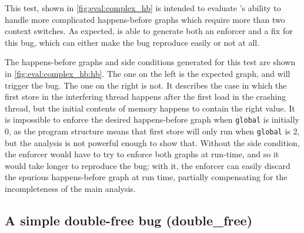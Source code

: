 This test, shown in \autoref{fig:eval:complex_hb} is intended to
evaluate {\technique}'s ability to handle more complicated
happens-before graphs which require more than two context switches.
As expected, {\implementation} is able to generate both an enforcer
and a fix for this bug, which can either make the bug reproduce easily
or not at all.

The happens-before graphs and side conditions generated for this test
are shown in \autoref{fig:eval:complex_hb:hb}.  The one on the left
is the expected graph, and will trigger the bug.  The one on the right
is not.  It describes the case in which the first store in the
interfering thread happens after the first load in the crashing
thread, but the initial contents of memory happens to contain the
right value.  It is impossible to enforce the desired happens-before
graph when \texttt{global} is initially 0, as the program structure
means that first store will only run when \texttt{global} is 2, but
the {\technique} analysis is not powerful enough to show that.
Without the side condition, the enforcer would have to try to enforce
both graphs at run-time, and so it would take longer to reproduce the
bug; with it, the enforcer can easily discard the spurious
happens-before graph at run time, partially compensating for the
incompleteness of the main analysis.

\subsection{A simple double-free bug (double\_free)}

